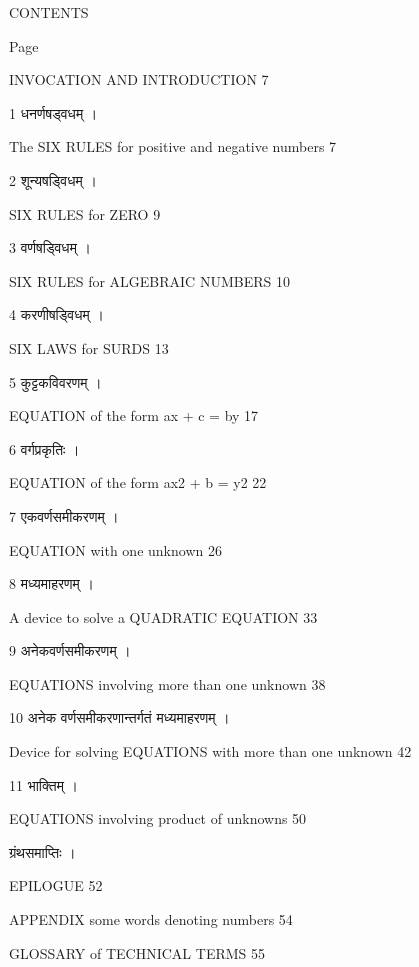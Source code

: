 \documentclass[]{article}
\date{}
\begin{document}
{CONTENTS}

{Page}

{ INVOCATION AND INTRODUCTION }{7}

{1 धनर्णषड्वधम् । }

{ The SIX RULES for positive and negative numbers 7 }

{2 शून्यषड्विधम् । }

{ SIX RULES for ZERO 9 }

{3 वर्णषड्विधम् । }

{ SIX RULES for ALGEBRAIC NUMBERS 10}

{4 करणीषड्विधम् । }

{ SIX LAWS for SURDS 13}

{5 कुट्टकविवरणम् । }

{ EQUATION of the form ax + c = by 17}

{6 वर्गप्रकृतिः । }

{ EQUATION of the form ax2 + b = y2 22}

{7 एकवर्णसमीकरणम् । }

{ EQUATION with one unknown 26 }

{8 मध्यमाहरणम् । }

{ A device to solve a QUADRATIC EQUATION 33}

{9 अनेकवर्णसमीकरणम् । }

{ EQUATIONS involving more than one unknown 38}

{10 अनेक वर्णसमीकरणान्तर्गतं मध्यमाहरणम् । }

{ Device for solving EQUATIONS with more than one unknown 42}

{11 भा}{क्ति}{म् । }

{ EQUATIONS involving product of unknowns 50}

{ ग्रंथसमाप्तिः । }

{ EPILOGUE 52}

{ APPENDIX some words denoting numbers 54}

{ GLOSSARY of TECHNICAL TERMS 55}

{\\
}
\end{document}
